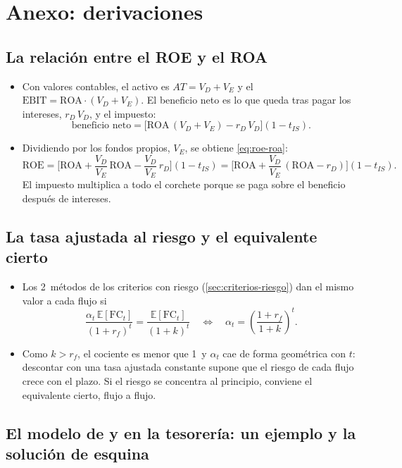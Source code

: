 \documentclass[11pt]{article}
\begin{document}
\section{Anexo: derivaciones}\label{anexo:derivaciones}

\subsection{La relación entre el ROE y el ROA}\label{anexo:roe-roa}

\begin{itemize}
\item Con valores contables, el activo es $AT=V_D+V_E$ y el $\mathrm{EBIT}=\mathrm{ROA}\cdot(V_D+V_E)$. El beneficio neto es lo que queda tras pagar los intereses, $r_D\,V_D$, y el impuesto:
  \[
  \text{beneficio neto}=\big[\mathrm{ROA}\,(V_D+V_E)-r_D\,V_D\big](1-t_{IS}).
  \]
\item Dividiendo por los fondos propios, $V_E$, se obtiene \eqref{eq:roe-roa}:
  \[
  \mathrm{ROE}=\Big[\mathrm{ROA}+\frac{V_D}{V_E}\,\mathrm{ROA}-\frac{V_D}{V_E}\,r_D\Big](1-t_{IS})=\Big[\mathrm{ROA}+\frac{V_D}{V_E}\,(\mathrm{ROA}-r_D)\Big](1-t_{IS}).
  \]
  El impuesto multiplica a todo el corchete porque se paga sobre el beneficio después de intereses.\findemo
\end{itemize}

\subsection{La tasa ajustada al riesgo y el equivalente cierto}\label{anexo:equivalente}

\begin{itemize}
\item Los 2~métodos de los criterios con riesgo (\ref{sec:criterios-riesgo}) dan el mismo valor a cada flujo si
  \[
  \frac{\alpha_t\,\mathbb{E}[\mathrm{FC}_t]}{(1+r_f)^t}=\frac{\mathbb{E}[\mathrm{FC}_t]}{(1+k)^t}\quad\Longleftrightarrow\quad\alpha_t=\left(\frac{1+r_f}{1+k}\right)^{t}.
  \]
\item Como $k>r_f$, el cociente es menor que 1~y $\alpha_t$ cae de forma geométrica con $t$: descontar con una tasa ajustada constante supone que el riesgo de cada flujo crece con el plazo. Si el riesgo se concentra al principio, conviene el equivalente cierto, flujo a flujo.\findemo
\end{itemize}

\subsection{El modelo de  y  en la tesorería:\cortetitulo{} un ejemplo y la solución de esquina}\label{anexo:baumol-esquina}
\end{document}
